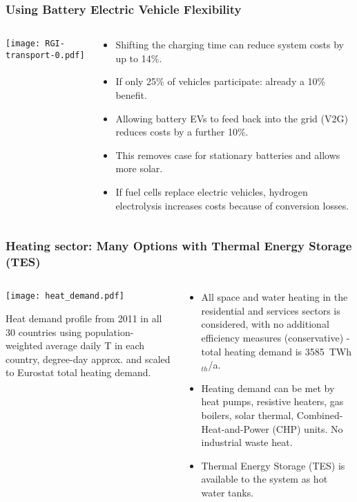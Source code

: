 \documentclass[10pt,aspectratio=169,dvipsnames]{beamer}
\def\th{${}_{th}$}
\let\olditem\item
\renewcommand{\item}{%
\olditem\vspace{5pt}}
\begin{document}
\begin{frame}
  \frametitle{Using Battery Electric Vehicle Flexibility}
  \begin{columns}[T]
    \begin{column}{9cm}
      \texttt{[image: RGI-transport-0.pdf]}


    \end{column}
    \begin{column}{6cm}
      \begin{itemize}
      \item Shifting the charging time can reduce system costs by up to 14\%.
      \item If only 25\% of vehicles participate: already a 10\% benefit.
      \item Allowing battery EVs to feed back into the grid (V2G) reduces costs by a further 10\%.
      \item This removes case for stationary batteries and allows more solar.
      \item If fuel cells replace electric vehicles, hydrogen electrolysis increases costs because of conversion losses.
      \end{itemize}
    \end{column}
  \end{columns}
\end{frame}












\begin{frame}
  \frametitle{Heating sector: Many Options with Thermal Energy Storage (TES)}
\begin{columns}[T]
\begin{column}{7cm}

    \texttt{[image: heat\_demand.pdf]}

    Heat demand profile from 2011 in all 30 countries using population-weighted average daily T in each country, degree-day approx. and scaled to Eurostat total heating demand.


\end{column}
\begin{column}{7cm}
  \begin{itemize}
  \item All space and water heating in the residential and services
    sectors is considered, with no additional efficiency measures
    (conservative) - total heating demand is  3585~TWh\th/a.
  \item Heating demand can be met by heat pumps, resistive heaters, gas boilers, solar thermal, Combined-Heat-and-Power (CHP) units. No industrial waste heat.
    \item Thermal Energy Storage (TES) is available to the system as hot water tanks.
  \end{itemize}
\end{column}
\end{columns}

\end{frame}
\end{document}
